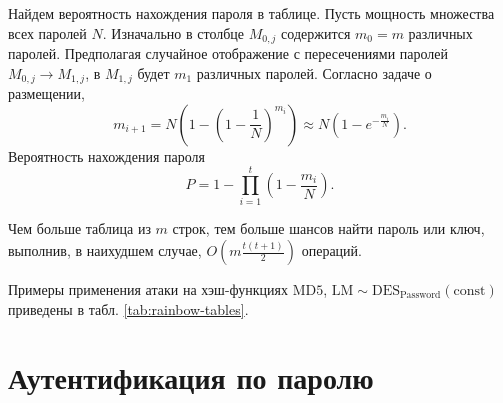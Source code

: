 \documentclass[10pt,a4paper]{book}
\begin{document}
Найдем вероятность нахождения пароля в таблице. Пусть мощность множества всех паролей $N$. Изначально в столбце $M_{0,j}$ содержится $m_0 = m$ различных паролей. Предполагая случайное отображение с пересечениями паролей $M_{0,j} \rightarrow M_{1,j}$, в $M_{1,j}$ будет $m_1$ различных паролей. Согласно задаче о размещении,
\[
    m_{i+1} = N \left( 1 - \left( 1 - \frac{1}{N} \right)^{m_i} \right) \approx N \left( 1 - e^{-\frac{m_i}{N}} \right).
\]
Вероятность нахождения пароля
\[
    P = 1 - \prod \limits_{i=1}^t \left( 1 - \frac{m_i}{N} \right).
\]

Чем больше таблица из $m$ строк, тем больше шансов найти пароль или ключ, выполнив, в наихудшем случае,   $O \left( m \frac{t(t+1)}{2} \right)$ операций.

Примеры применения атаки на хэш-функциях $\textrm{MD5}$, $\textrm{LM} \sim \textrm{DES}_{\textrm{Password}} (\textrm{const})$ приведены в табл. \ref{tab:rainbow-tables}.

\begin{table}[h!]
    \centering
    \caption{Атаки на радужных таблицах на \emph{одном} ПК\label{tab:rainbow-tables}}
\end{table}


\section{Аутентификация по паролю}
\end{document}
